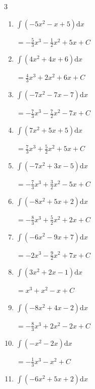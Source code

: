 \begin{multicols}{3}
\begin{enumerate}
  \item $\displaystyle \int \left( -5x^{2}-x+5 \right) \mathrm{d}x$

        $\displaystyle =-\frac{5}{3}x^{3}-\frac{1}{2}x^{2}+5x+ C$

  \item $\displaystyle \int \left( 4x^{2}+4x+6 \right) \mathrm{d}x$

        $\displaystyle =\frac{4}{3}x^{3}+2x^{2}+6x+ C$

  \item $\displaystyle \int \left( -7x^{2}-7x-7 \right) \mathrm{d}x$

        $\displaystyle =-\frac{7}{3}x^{3}-\frac{7}{2}x^{2}-7x+ C$

  \item $\displaystyle \int \left( 7x^{2}+5x+5 \right) \mathrm{d}x$

        $\displaystyle =\frac{7}{3}x^{3}+\frac{5}{2}x^{2}+5x+ C$

  \item $\displaystyle \int \left( -7x^{2}+3x-5 \right) \mathrm{d}x$

        $\displaystyle =-\frac{7}{3}x^{3}+\frac{3}{2}x^{2}-5x+ C$

\columnbreak %

  \item $\displaystyle \int \left( -8x^{2}+5x+2 \right) \mathrm{d}x$

        $\displaystyle =-\frac{8}{3}x^{3}+\frac{5}{2}x^{2}+2x+ C$

  \item $\displaystyle \int \left( -6x^{2}-9x+7 \right) \mathrm{d}x$

        $\displaystyle =-2x^{3}-\frac{9}{2}x^{2}+7x+ C$

  \item $\displaystyle \int \left( 3x^{2}+2x-1 \right) \mathrm{d}x$

        $\displaystyle =x^{3}+x^{2}-x+ C$

  \item $\displaystyle \int \left( -8x^{2}+4x-2 \right) \mathrm{d}x$

        $\displaystyle =-\frac{8}{3}x^{3}+2x^{2}-2x+ C$

  \item $\displaystyle \int \left( -x^{2}-2x \right) \mathrm{d}x$

        $\displaystyle =-\frac{1}{3}x^{3}-x^{2}+ C$

  \item $\displaystyle \int \left( -6x^{2}+5x+2 \right) \mathrm{d}x$


\end{enumerate}
\end{multicols}
